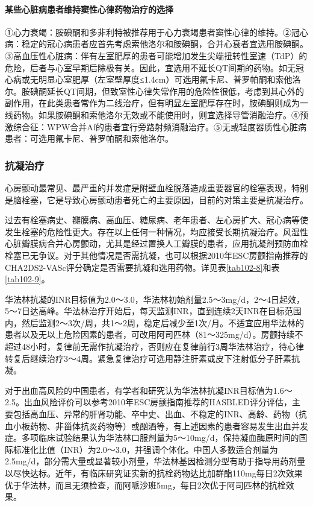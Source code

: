 \paragraph{某些心脏病患者维持窦性心律药物治疗的选择}

①心力衰竭：胺碘酮和多非利特被推荐用于心力衰竭患者窦性心律的维持。②冠心病：稳定的冠心病患者应首先考虑索他洛尔和胺碘酮，合并心衰者宜选用胺碘酮。③高血压性心脏病：伴有左室肥厚的患者可能增加发生尖端扭转性室速（TdP）的危险，后者与心室早期后除极有关。因此，宜选用不延长QT间期的药物。如无冠心病或无明显心室肥厚（左室壁厚度≤1.4cm）可选用氟卡尼、普罗帕酮和索他洛尔。胺碘酮延长QT间期，但致室性心律失常作用的危险性很低，考虑到其心外的副作用，在此类患者常作为二线治疗，但有明显左室肥厚存在时，胺碘酮则成为一线药物。如果胺碘酮和索他洛尔无效或不能使用时，则宜选择导管消融治疗。④预激综合征：WPW合并Af的患者宜行旁路射频消融治疗。⑤无或轻度器质性心脏病患者：可选用氟卡尼、普罗帕酮和索他洛尔。

\subsubsection{抗凝治疗}

心房颤动最常见、最严重的并发症是附壁血栓脱落造成重要器官的栓塞表现，特别是脑栓塞，它是导致心房颤动患者死亡的主要原因，目前的对策主要是抗凝治疗。

过去有栓塞病史、瓣膜病、高血压、糖尿病、老年患者、左心房扩大、冠心病等使发生栓塞的危险性更大。存在以上任何一种情况，均应接受长期抗凝治疗。风湿性心脏瓣膜病合并心房颤动，尤其是经过置换人工瓣膜的患者，应用抗凝剂预防血栓栓塞已无争议。对于其他情况是否需抗凝，也可以根据2010年ESC房颤指南推荐的CHA2DS2-VASc评分确定是否需要抗凝和选用药物。详见表\ref{tab102-8}和表\ref{tab102-9}。

华法林抗凝的INR目标值为2.0～3.0，华法林初始剂量2.5～3mg/d，2～4日起效，5～7日达高峰。华法林治疗开始后，每天监测INR，直到连续2天INR在目标范围内，然后监测2～3次/周，共1～2周，稳定后减少至1次/月。不适宜应用华法林的患者以及无以上危险因素的患者，可改用阿司匹林（81～325mg/d）。房颤持续不超过48小时，复律前无需作抗凝治疗，否则应在复律前行3周华法林治疗，待心律转复后继续治疗3～4周。紧急复律治疗可选用静注肝素或皮下注射低分子肝素抗凝。

对于出血高风险的中国患者，有学者和研究认为华法林抗凝INR目标值为1.6～2.5。出血风险评价可以参考2010年ESC房颤指南推荐的HASBLED评分评估，主要包括高血压、异常的肝肾功能、卒中史、出血、不稳定的INR、高龄、药物（抗血小板药物、非甾体抗炎药物等）或酗酒等，有上述因素的患者容易发生出血并发症。多项临床试验结果认为华法林口服剂量为5～10mg/d，保持凝血酶原时间的国际标准化比值（INR）为2.0～3.0，并强调个体化。中国人多数适合剂量为2.5mg/d，部分需大量或显著较小剂量，华法林基因检测分型有助于指导用药剂量以尽快达标。近年，有临床研究证实新的抗栓药物达比加群酯110mg每日2次效果优于华法林，而且无须检查，而阿哌沙班5mg，每日2次优于阿司匹林的抗栓效果。

